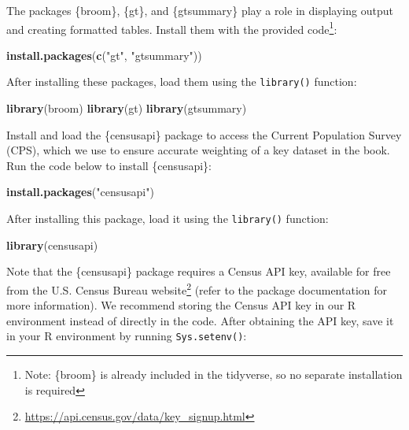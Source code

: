 \documentclass[
]{krantz}
\makeatletter
\newenvironment{Shaded}{\begin{snugshade}}{\end{snugshade}}
\newcommand{\FunctionTok}[1]{\textcolor[rgb]{0.27,0.27,0.27}{\textbf{#1}}}
\newcommand{\NormalTok}[1]{#1}
\newcommand{\StringTok}[1]{\textcolor[rgb]{0.5,0.5,0.5}{#1}}
\renewcommand{\href}[2]{#2\footnote{\url{#1}}}
\newenvironment{kframe}{%
\medskip{}
\setlength{\fboxsep}{.8em}
 \def\at@end@of@kframe{}%
 \ifinner\ifhmode%
  \def\at@end@of@kframe{\end{minipage}}%
  \begin{minipage}{\columnwidth}%
 \fi\fi%
 \def\FrameCommand##1{\hskip\@totalleftmargin \hskip-\fboxsep
 \colorbox{shadecolor}{##1}\hskip-\fboxsep
     \hskip-\linewidth \hskip-\@totalleftmargin \hskip\columnwidth}%
 \MakeFramed {\advance\hsize-\width
   \@totalleftmargin\z@ \linewidth\hsize
   \@setminipage}}%
 {\par\unskip\endMakeFramed%
 \at@end@of@kframe}
\renewenvironment{Shaded}{\begin{kframe}}{\end{kframe}}
\makeatother
\begin{document}
The packages \{broom\}, \{gt\}, and \{gtsummary\} play a role in displaying output and creating formatted tables. Install them with the provided code\footnote{Note: \{broom\} is already included in the tidyverse, so no separate installation is required}:

\begin{Shaded}
\begin{Highlighting}[]
\FunctionTok{install.packages}\NormalTok{(}\FunctionTok{c}\NormalTok{(}\StringTok{"gt"}\NormalTok{, }\StringTok{"gtsummary"}\NormalTok{))}
\end{Highlighting}
\end{Shaded}

After installing these packages, load them using the \texttt{library()} function:

\begin{Shaded}
\begin{Highlighting}[]
\FunctionTok{library}\NormalTok{(broom)}
\FunctionTok{library}\NormalTok{(gt)}
\FunctionTok{library}\NormalTok{(gtsummary)}
\end{Highlighting}
\end{Shaded}

Install and load the \{censusapi\} package to access the Current Population Survey (CPS), which we use to ensure accurate weighting of a key dataset in the book. Run the code below to install \{censusapi\}:

\begin{Shaded}
\begin{Highlighting}[]
\FunctionTok{install.packages}\NormalTok{(}\StringTok{"censusapi"}\NormalTok{)}
\end{Highlighting}
\end{Shaded}

After installing this package, load it using the \texttt{library()} function:

\begin{Shaded}
\begin{Highlighting}[]
\FunctionTok{library}\NormalTok{(censusapi)}
\end{Highlighting}
\end{Shaded}

Note that the \{censusapi\} package requires a Census API key, available for free from the \href{https://api.census.gov/data/key_signup.html}{U.S. Census Bureau website} (refer to the package documentation for more information). We recommend storing the Census API key in our R environment instead of directly in the code. After obtaining the API key, save it in your R environment by running \texttt{Sys.setenv()}:
\end{document}
